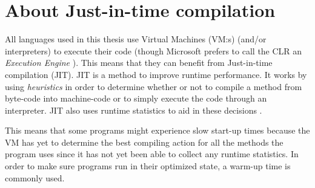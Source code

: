 \section{About Just-in-time compilation}
All languages used in this thesis use Virtual Machines (VM:s) (and/or interpreters) to execute their code (though Microsoft prefers to call the CLR an \textit{Execution Engine} \cite{ExecutionEngine}). This means that they can benefit from Just-in-time compilation (JIT). JIT is a method to improve runtime performance. It works by using \textit{heuristics} in order to determine whether or not to compile a method from byte-code into machine-code or to simply execute the code through an interpreter. JIT also uses runtime statistics to aid in these decisions \cite{Jit}.

This means that some programs might experience slow start-up times because the VM has yet to determine the best compiling action for all the methods the program uses since it has not yet been able to collect any runtime statistics. In order to make sure programs run in their optimized state, a warm-up time is commonly used.
